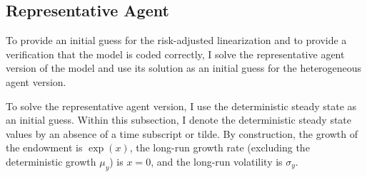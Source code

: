 \documentclass[12 pt, oneside]{article}
\theoremstyle{definition}
\theoremstyle{definition}
\theoremstyle{definition}
\begin{document}
\subsection{Representative Agent}
To provide an initial guess for the risk-adjusted linearization and to provide a verification that the model is coded correctly, I solve the representative agent version of the model and use its solution as an initial guess for the heterogeneous agent version.

To solve the representative agent version, I use the deterministic steady state as an initial guess.
Within this subsection, I denote the deterministic steady state values by an absence of a time subscript or tilde. By construction, the growth of the endowment is $\exp(x)$, the long-run growth rate (excluding the deterministic growth $\mu_y$) is $x = 0$, and the long-run volatility is $\sigma_y$.
\end{document}
